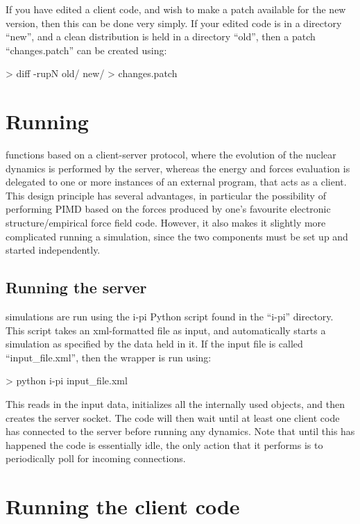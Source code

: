 \documentclass[11pt,english,fleqn]{report}
\newenvironment{code}{%
\footnotesize 
\verbatim
}{
\endverbatim
\normalsize
}
\begin{document}
If you have edited a client code, and wish to make a patch available
for the new version, then this can be done very simply.
If your edited code is in a directory {}``new'', and a clean
distribution is held in a directory {}``old'', then a patch
{}``changes.patch'' can be created using:

\begin{code}
> diff -rupN old/ new/ > changes.patch
\end{code}

\section{Running \ipi}

\ipi functions based on a client-server protocol, where the evolution of the nuclear dynamics
is performed by the \ipi server, whereas the energy and forces evaluation is delegated to 
one or more instances of an external program, that acts as a client. This design principle
has several advantages, in particular the possibility of performing PIMD based on the forces
produced by one's favourite electronic structure/empirical force field code. However, it 
also makes it slightly more complicated running a simulation, since the two components
must be set up and started independently.

\subsection{Running the \ipi server}

\label{runningsimulations}

\ipi simulations are run using the i-pi Python script found in the
{}``i-pi'' directory. This script takes an xml-formatted file as
input, and automatically starts a simulation as specified by the data
held in it. If the input file is called {}``input\_file.xml'', then
the wrapper is run using:

\begin{code}
> python i-pi input_file.xml
\end{code}

This reads in the input data, initializes all the internally used
objects, and then creates the server socket. The code will then wait
until at least one client code has connected to the server before
running any dynamics. Note that until this has happened the code is
essentially idle, the only action that it performs is to periodically
poll for incoming connections.


\section{Running the client code}
\end{document}

